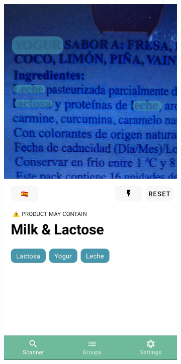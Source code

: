 \begin{figure}[h]
    \centering
    \begin{subfigure}{0.3\textwidth}
        \centering
        \includegraphics[width=0.9\linewidth]{Figures/soosee-1.jpg}
        \caption{}
        \label{fig:yuka-1}
    \end{subfigure}
    \begin{subfigure}{0.3\textwidth}
        \centering

\end{subfigure}
\end{figure}
